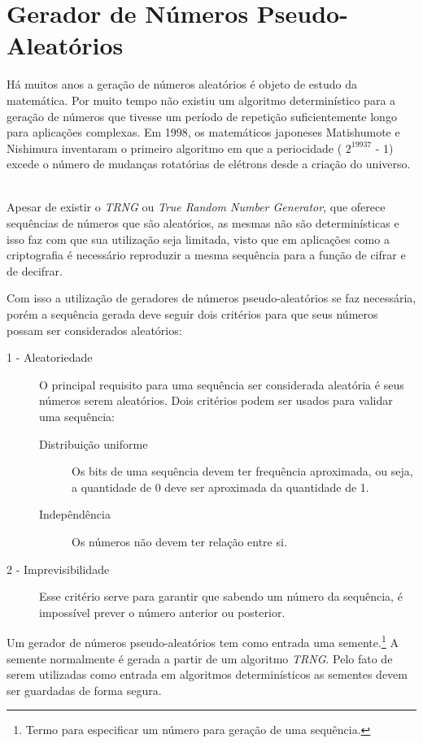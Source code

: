 \chapter{Gerador de Números Pseudo-Aleatórios}
\label{pseudo-random-number-generator}

% 
Há muitos anos a geração de números aleatórios é objeto de estudo da matemática. Por muito tempo não existiu um algoritmo determinístico para a geração de números que tivesse um período de repetição suficientemente longo para aplicações complexas. Em 1998, os matemáticos japoneses Matishumote e Nishimura inventaram o primeiro algoritmo em que a periocidade ( $2 ^ {19937}$ - 1) excede o número de mudanças rotatórias de elétrons desde a criação do universo. ~\cite{cristophe-diethelm} 

%
Apesar de existir o \textit{TRNG} ou \textit{True Random Number Generator}, que oferece sequências de números que são aleatórios, as mesmas não são determinísticas e isso faz com que sua utilização seja limitada, visto que em aplicações como a criptografia é necessário reproduzir a mesma sequência para a função de cifrar e de decifrar. 

%
Com isso a utilização de geradores de números pseudo-aleatórios se faz necessária, porém a sequência gerada deve seguir dois critérios para que seus números possam ser considerados aleatórios:

\begin{description}
	\item [1 - Aleatoriedade]
	O principal requisito para uma sequência ser considerada aleatória é seus números serem aleatórios. Dois critérios podem ser usados para validar uma sequência:
		\begin{description}
			\item [Distribuição uniforme]
			Os bits de uma sequência devem ter frequência aproximada, ou seja, a quantidade de 0 deve ser aproximada da quantidade de 1.
			\item [Indepêndência]
			Os números não devem ter relação entre si.
			
		\end{description}
	\item [2 - Imprevisibilidade]
	Esse critério serve para garantir que sabendo um número da sequência, é impossível prever o número anterior ou posterior.
\end{description}

Um gerador de números pseudo-aleatórios tem como entrada uma semente.\footnote{Termo para especificar um número para geração de uma sequência.} A semente normalmente é gerada a partir de um algoritmo \textit{TRNG}. Pelo fato de serem utilizadas como entrada em algoritmos determinísticos as sementes devem ser guardadas de forma segura.

